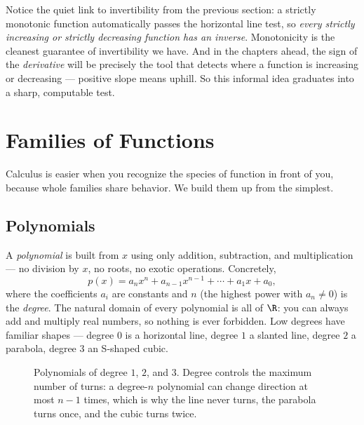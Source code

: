\begin{connectionbox}
Notice the quiet link to invertibility from the previous section: a strictly
monotonic function automatically passes the horizontal line test, so \emph{every
strictly increasing or strictly decreasing function has an inverse}. Monotonicity
is the cleanest guarantee of invertibility we have. And in the chapters ahead, the
sign of the \emph{derivative} will be precisely the tool that detects where a
function is increasing or decreasing --- positive slope means uphill. So this
informal idea graduates into a sharp, computable test.
\end{connectionbox}

\section{Families of Functions}
\label{ch02:families}

Calculus is easier when you recognize the species of function in front of you,
because whole families share behavior. We build them up from the simplest.

\subsection{Polynomials}

A \emph{polynomial} is built from $x$ using only addition, subtraction, and
multiplication --- no division by $x$, no roots, no exotic operations. Concretely,
\[
  p(x) = a_n x^n + a_{n-1} x^{n-1} + \cdots + a_1 x + a_0,
\]
where the coefficients $a_i$ are constants and $n$ (the highest power with
$a_n\ne 0$) is the \emph{degree}. The natural domain of every polynomial is all of
$\R$: you can always add and multiply real numbers, so nothing is ever forbidden.
Low degrees have familiar shapes --- degree $0$ is a horizontal line, degree $1$ a
slanted line, degree $2$ a parabola, degree $3$ an S-shaped cubic.

\begin{figure}[H]
\centering
{}
\caption{Polynomials of degree $1$, $2$, and $3$. Degree controls the maximum
number of turns: a degree-$n$ polynomial can change direction at most $n-1$ times,
which is why the line never turns, the parabola turns once, and the cubic turns
twice.}
\label{ch02:fig-polynomials}
\end{figure}

